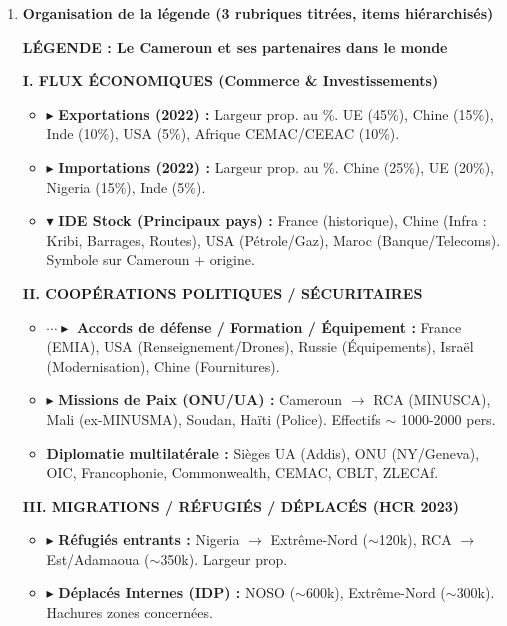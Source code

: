 \documentclass[11pt]{article}
\begin{document}
\begin{corrige}
\begin{enumerate}
    \item \textbf{Organisation de la légende (3 rubriques titrées, items hiérarchisés)}
    \begin{center}
    \textbf{LÉGENDE : Le Cameroun et ses partenaires dans le monde}
    \end{center}
    \textbf{I. FLUX ÉCONOMIQUES (Commerce \& Investissements)}
    \begin{itemize}
        \item \textcolor{popblue}{$\blacktriangleright$} \textbf{Exportations (2022) :} Largeur prop. au \%. UE (45\%), Chine (15\%), Inde (10\%), USA (5\%), Afrique CEMAC/CEEAC (10\%).
        \item \textcolor{poporange}{$\blacktriangleright$} \textbf{Importations (2022) :} Largeur prop. au \%. Chine (25\%), UE (20\%), Nigeria (15\%), Inde (5\%).
        \item \textcolor{popgreen}{$\blacktriangledown$} \textbf{IDE Stock (Principaux pays) :} France (historique), Chine (Infra : Kribi, Barrages, Routes), USA (Pétrole/Gaz), Maroc (Banque/Telecoms). Symbole sur Cameroun + origine.
    \end{itemize}
    \textbf{II. COOPÉRATIONS POLITIQUES / SÉCURITAIRES}
    \begin{itemize}
        \item \textcolor{poppurple}{$\cdots\blacktriangleright$} \textbf{Accords de défense / Formation / Équipement :} France (EMIA), USA (Renseignement/Drones), Russie (Équipements), Israël (Modernisation), Chine (Fournitures).
        \item \textcolor{popblue}{$\blacktriangleright$} \textbf{Missions de Paix (ONU/UA) :} Cameroun $\to$ RCA (MINUSCA), Mali (ex-MINUSMA), Soudan, Haïti (Police). Effectifs $\sim$ 1000-2000 pers.
        \item \textbf{Diplomatie multilatérale :} Sièges UA (Addis), ONU (NY/Geneva), OIC, Francophonie, Commonwealth, CEMAC, CBLT, ZLECAf.
    \end{itemize}
    \textbf{III. MIGRATIONS / RÉFUGIÉS / DÉPLACÉS (HCR 2023)}
    \begin{itemize}
        \item \textcolor{popred}{$\blacktriangleright$} \textbf{Réfugiés entrants :} Nigeria $\to$ Extrême-Nord ($\sim$120k), RCA $\to$ Est/Adamaoua ($\sim$350k). Largeur prop.
        \item \textcolor{popred!50}{$\blacktriangleright$} \textbf{Déplacés Internes (IDP) :} NOSO ($\sim$600k), Extrême-Nord ($\sim$300k). Hachures zones concernées.

\end{itemize}
\end{enumerate}
\end{corrige}
\end{document}
